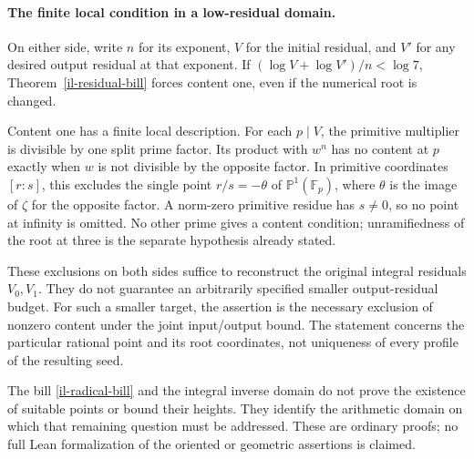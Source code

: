 \paragraph{The finite local condition in a low-residual domain.}
On either side, write $n$ for its exponent, $V$ for the initial
residual, and $V'$ for any desired output residual at that exponent.
If $(\log V+\log V')/n<\log7$, Theorem~\ref{il-residual-bill}
forces content one, even if the numerical root is changed.

Content one has a finite local description. For each $p\mid V$,
the primitive multiplier is divisible by one split prime factor.
Its product with $w^n$ has no content at $p$ exactly when $w$ is
not divisible by the opposite factor. In primitive coordinates
$[r:s]$, this excludes the single point $r/s=-\theta$ of
$\mathbb P^1(\mathbb F_p)$, where $\theta$ is the image of
$\zeta$ for the opposite factor. A norm-zero primitive residue
has $s\ne0$, so no point at infinity is omitted. No other prime
gives a content condition; unramifiedness of the root at three
is the separate hypothesis already stated.

These exclusions on both sides suffice to reconstruct the original
integral residuals $V_0,V_1$. They do not guarantee an arbitrarily
specified smaller output-residual budget. For such a smaller
target, the assertion is the necessary exclusion of nonzero content
under the joint input/output bound. The statement concerns the
particular rational point and its root coordinates, not uniqueness
of every profile of the resulting seed.

The bill \eqref{il-radical-bill} and the integral inverse domain
do not prove the existence of suitable points or bound their heights.
They identify the arithmetic domain on which that remaining question
must be addressed. These are ordinary proofs; no full Lean
formalization of the oriented or geometric assertions is claimed.
